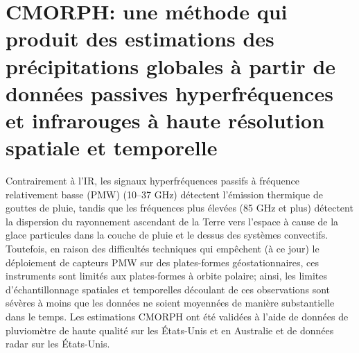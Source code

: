 \section{CMORPH: une méthode qui produit des estimations des précipitations globales à partir de données passives hyperfréquences et infrarouges à haute résolution spatiale et temporelle}
Contrairement à l'IR, les signaux hyperfréquences passifs à fréquence relativement basse (PMW) (10–37 GHz) détectent l'émission thermique de gouttes de pluie, tandis que les fréquences plus élevées (85 GHz et plus) détectent la dispersion du rayonnement ascendant de la Terre vers l'espace à cause de la glace particules dans la couche de pluie et le dessus des systèmes convectifs. Toutefois, en raison des difficultés techniques qui empêchent (à ce jour) le déploiement de capteurs PMW sur des plates-formes géostationnaires, ces instruments sont limités aux plates-formes à orbite polaire; ainsi, les limites d'échantillonnage spatiales et temporelles découlant de ces observations sont sévères à moins que les données ne soient moyennées de manière substantielle dans le temps. Les estimations CMORPH ont été validées à l'aide de données de pluviomètre de haute qualité sur les États-Unis et en Australie et de données radar sur les États-Unis. \cite{joyce_cmorph:_2004}

